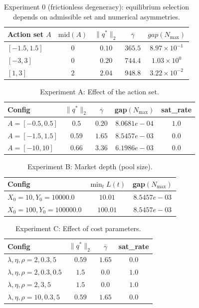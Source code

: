 \documentclass[11pt]{article}
\theoremstyle{definition}
\begin{document}
\begin{table}[H]
\centering
\caption{Experiment 0 (frictionless degeneracy): equilibrium selection depends on admissible set and numerical asymmetries.}
\label{tab:exp0}
\begin{tabular}{lcccc}
\toprule
Action set $A$ & $\mathrm{mid}(A)$ & $\|q^*\|_2$ & $\overline{\gamma}$ & $gap(N_{\max})$ \\
\midrule
$[-1.5,1.5]$    & $0$   & $0.10$ & $365.5$     & $8.97\times 10^{-1}$ \\
$[-3,3]$        & $0$   & $0.20$ & $744.4$     & $1.03\times 10^{0}$ \\
$[1,3]$         & $2$   & $2.04$ & $948.8$ & $3.22\times 10^{-2}$ \\
\bottomrule
\end{tabular}
\end{table}

\begin{table}[H]
\centering
\caption{Experiment A: Effect of the action set.}
\label{tab:expA}
\begin{tabular}{lcccc}
\toprule
Config & 
$\|q^\ast\|_2$ &
$\overline{\gamma}$ &
gap$(N_{\max})$ &
sat\_rate
\\
\midrule
$A=[-0.5,0.5]$ & $0.5$ & $0.20$ & $8.0681e-04$  & $1.0$ \\
$A=[-1.5,1.5]$ & $0.59$ & $1.65$ & $8.5457e-03$ & $0.0$ \\
$A=[-10,10]$ & $0.66$ & $3.36$ & $6.1986e-03$  & $0.0$ \\
\bottomrule
\end{tabular}%
\end{table}

\begin{table}[H]
\centering
\caption{Experiment B: Market depth (pool size).}
\label{tab:expB}
\begin{tabular}{lcc}
\toprule
Config &
$\min_t L(t)$ &
gap$(N_{\max})$
\\
\midrule
$X_0=10, Y_0=10000.0$ & $10.01$ & $8.5457e-03$  \\
$X_0=100, Y_0=100000.0$ & $100.01$ & $8.5457e-03$ \\
\bottomrule
\end{tabular}
\end{table}

\begin{table}[H]
\centering
\caption{Experiment C: Effect of cost parameters.}
\label{tab:expC}
\begin{tabular}{lccc}
\toprule
Config &
$\|q^\ast\|_2$ &
$\overline{\gamma}$ &
sat\_rate
\\
\midrule
$\lambda,\eta,\rho=2, 0.3, 5$ & $0.59$ & $1.65$ & $0.0$ \\
$\lambda,\eta,\rho=2, 0.3, 0.5$ & $1.5$ & $0.0$ & $1.0$\\
$\lambda,\eta,\rho=2, 3, 5$ & $1.5$ & $0.0$ & $1.0$\\
$\lambda,\eta,\rho=10, 0.3, 5$ & $0.59$ & $1.65$ & $0.0$\\
\bottomrule
\end{tabular}%
\end{table}
\end{document}
